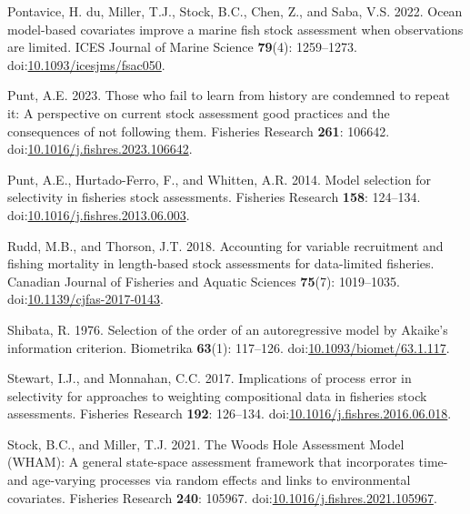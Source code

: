 \begin{CSLReferences}{1}{0}
Pontavice, H. du, Miller, T.J., Stock, B.C., Chen, Z., and Saba, V.S.
2022. Ocean model-based covariates improve a marine fish stock
assessment when observations are limited. ICES Journal of Marine Science
\textbf{79}(4): 1259--1273.
doi:\href{https://doi.org/10.1093/icesjms/fsac050}{10.1093/icesjms/fsac050}.

Punt, A.E. 2023. Those who fail to learn from history are condemned to
repeat it: A perspective on current stock assessment good practices and
the consequences of not following them. Fisheries Research \textbf{261}:
106642.
doi:\href{https://doi.org/10.1016/j.fishres.2023.106642}{10.1016/j.fishres.2023.106642}.

Punt, A.E., Hurtado-Ferro, F., and Whitten, A.R. 2014. Model selection
for selectivity in fisheries stock assessments. Fisheries Research
\textbf{158}: 124--134.
doi:\href{https://doi.org/10.1016/j.fishres.2013.06.003}{10.1016/j.fishres.2013.06.003}.

Rudd, M.B., and Thorson, J.T. 2018. Accounting for variable recruitment
and fishing mortality in length-based stock assessments for data-limited
fisheries. Canadian Journal of Fisheries and Aquatic Sciences
\textbf{75}(7): 1019--1035.
doi:\href{https://doi.org/10.1139/cjfas-2017-0143}{10.1139/cjfas-2017-0143}.

Shibata, R. 1976. Selection of the order of an autoregressive model by
{A}kaike's information criterion. Biometrika \textbf{63}(1): 117--126.
doi:\href{https://doi.org/10.1093/biomet/63.1.117}{10.1093/biomet/63.1.117}.

Stewart, I.J., and Monnahan, C.C. 2017. Implications of process error in
selectivity for approaches to weighting compositional data in fisheries
stock assessments. Fisheries Research \textbf{192}: 126--134.
doi:\href{https://doi.org/10.1016/j.fishres.2016.06.018}{10.1016/j.fishres.2016.06.018}.

Stock, B.C., and Miller, T.J. 2021. The {W}oods {H}ole {A}ssessment
{M}odel ({WHAM}): {A} general state-space assessment framework that
incorporates time- and age-varying processes via random effects and
links to environmental covariates. Fisheries Research \textbf{240}:
105967.
doi:\href{https://doi.org/10.1016/j.fishres.2021.105967}{10.1016/j.fishres.2021.105967}.


\end{CSLReferences}

